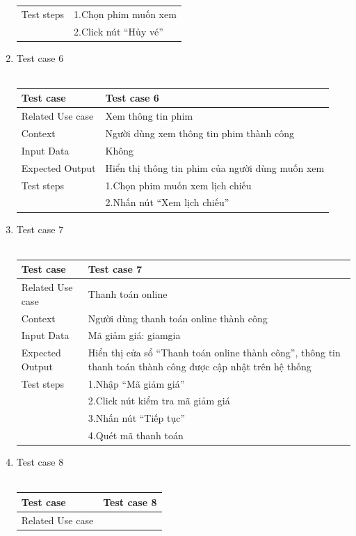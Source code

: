 \documentclass[a4paper, 12pt]{article}
\begin{document}
\begin{enumerate}
\begin{tabular}{|l|l|}
			\hline
			Test steps&
			1.Chọn phim muốn xem\\&
			2.Click nút “Hủy vé”\\
			\hline
		\end{tabular}
		\item Test case 6\\\\
		\begin{tabular}{|l|l|}
			\hline
			Test case&
			Test case 6\\
			\hline
			Related Use case&
			Xem thông tin phim\\
			\hline
			Context&
			Người dùng xem thông tin phim thành công\\
			\hline
			Input Data&
			Không\\
			\hline
			Expected Output&
			Hiển thị thông tin phim của người dùng muốn xem\\
			\hline
			Test steps&
			1.Chọn phim muốn xem lịch chiếu\\&
			2.Nhấn nút “Xem lịch chiếu”\\
			\hline
		\end{tabular}
		\item Test case 7\\\\
		\begin{tabular}{|l|l|}
			\hline
			Test case&
			Test case 7\\
			\hline
			Related Use case&
			Thanh toán online\\
			\hline
			Context&
			Người dùng thanh toán online thành công\\
			\hline
			Input Data&
			Mã giảm giá: giamgia\\
			\hline
			Expected Output&
			Hiển thị cửa sổ “Thanh toán online thành công”, thông tin thanh toán thành công được cập nhật trên hệ thống\\
			\hline
			Test steps&
			1.Nhập “Mã giảm giá”\\&
			2.Click nút kiểm tra mã giảm giá\\&
			3.Nhấn nút “Tiếp tục”\\&
			4.Quét mã thanh toán\\
			\hline
		\end{tabular}
		\item Test case 8\\\\
		\begin{tabular}{|l|l|}
			\hline
			Test case&
			Test case 8\\
			\hline
			Related Use case&

\end{tabular}
\end{enumerate}
\end{document}
